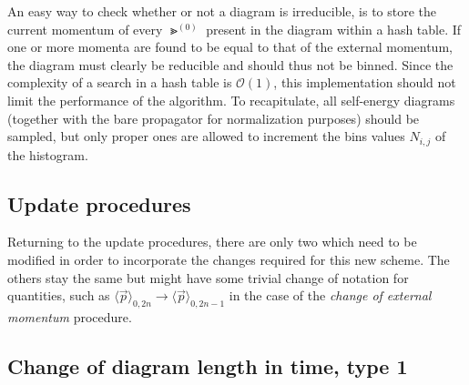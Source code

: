 An easy way to check whether or not a diagram is irreducible, is to store the current momentum of every $ \Gt^{(0)} $ present in the diagram within a hash table. If one or more momenta are found to be equal to that of the external momentum, the diagram must clearly be reducible and should thus not be binned. Since the complexity of a search in a hash table is $ \mathcal{O}(1) $, this implementation should not limit the performance of the algorithm. To recapitulate, all self-energy diagrams (together with the bare propagator for normalization purposes) should be sampled, but only proper ones are allowed to increment the bins values $ N_{i,j} $ of the histogram.

\subsection{Update procedures}

Returning to the update procedures, there are only two which need to be modified in order to incorporate the changes required for this new scheme. The others stay the same but might have some trivial change of notation for quantities, such as $ \langle \vec p \rangle_{0,2n} \rightarrow \langle \vec p \rangle_{0, 2n-1} $ in the case of the \textit{change of external momentum} procedure.

\subsection*{Change of diagram length in time, type 1}

